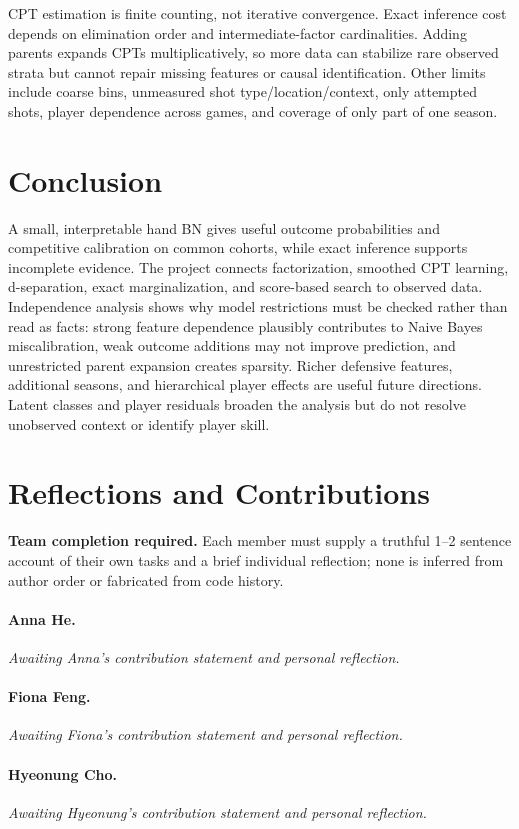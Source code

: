 \documentclass{article}
\begin{document}
CPT estimation is finite counting, not iterative convergence. Exact inference
cost depends on elimination order and intermediate-factor cardinalities. Adding
parents expands CPTs multiplicatively, so more data can stabilize rare observed
strata but cannot repair missing features or causal identification. Other limits
include coarse bins, unmeasured shot type/location/context, only attempted shots,
player dependence across games, and coverage of only part of one season.

\clearpage
\section{Conclusion}
A small, interpretable hand BN gives useful outcome probabilities and competitive
calibration on common cohorts, while exact inference supports incomplete evidence.
The project connects factorization, smoothed CPT learning, d-separation, exact
marginalization, and score-based search to observed data. Independence analysis
shows why model restrictions must be checked rather than read as facts: strong
feature dependence plausibly contributes to Naive Bayes miscalibration, weak outcome additions may not improve
prediction, and unrestricted parent expansion creates sparsity. Richer defensive
features, additional seasons, and hierarchical player effects are useful future
directions. Latent classes and player residuals broaden the analysis but do not
resolve unobserved context or identify player skill.

\section{Reflections and Contributions}
\textbf{Team completion required.} Each member must supply a truthful 1--2 sentence
account of their own tasks and a brief individual reflection; none is inferred
from author order or fabricated from code history.
\paragraph{Anna He.} \textit{Awaiting Anna's contribution statement and personal reflection.}
\paragraph{Fiona Feng.} \textit{Awaiting Fiona's contribution statement and personal reflection.}
\paragraph{Hyeonung Cho.} \textit{Awaiting Hyeonung's contribution statement and personal reflection.}
\end{document}
